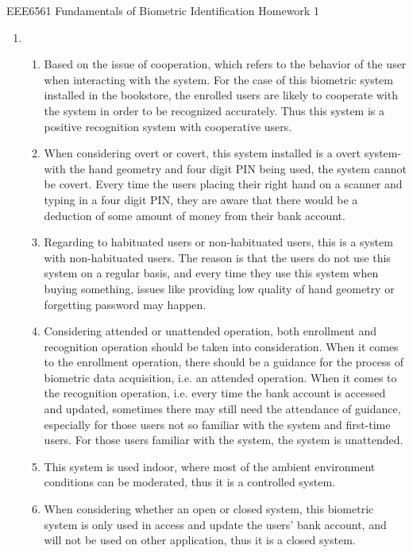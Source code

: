 \documentclass[a4paper]{article}
\begin{document}
\begin{spacing}{2.0}
\begin{flushleft}\begin{huge}EEE6561  Fundamentals of Biometric Identification   Homework 1\end{huge}\end{flushleft}
\begin{enumerate}
\item 
\begin{enumerate}
\item Based on the issue of cooperation, which refers to the behavior of the user when interacting with the system. For the case of this biometric system installed in the bookstore, the enrolled users are likely to cooperate with the system in order to be recognized accurately. Thus this system is a positive recognition system with cooperative users.
\item When considering overt or covert, this system installed is a overt system-with the hand geometry and four digit PIN being used, the system cannot be covert. Every time the users placing their right hand on a scanner and typing in a four digit PIN, they are aware that there would be a deduction of some amount of money from their bank account. 
\item Regarding to habituated users or non-habituated users, this is a system with non-habituated users. The reason is that the users do not use this system on a regular basis, and every time they use this system when buying something, issues like providing low quality of hand geometry or forgetting password may happen.
\item Considering attended or unattended operation, both enrollment and recognition operation should be taken into consideration. When it comes to the enrollment operation, there should be a guidance for the process of biometric data acquisition, i.e. an attended operation. When it comes to the recognition operation, i.e. every time the bank account is accessed and updated, sometimes there may still need the attendance of guidance, especially for those users not so familiar with the system and first-time users. For those users familiar with the system, the system is unattended.
\item This system is used indoor, where most of the ambient environment conditions can be moderated, thus it is a controlled system.
\item When considering whether an open or closed system, this biometric system is only used in access and update the users' bank account, and will not be used on other application, thus it is a closed system.
\end{enumerate}


\end{enumerate}
\end{spacing}
\end{document}
